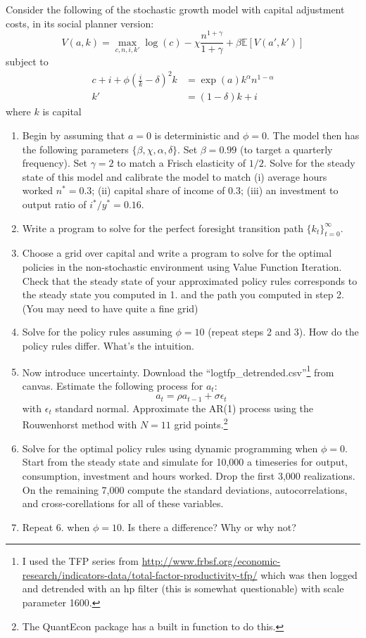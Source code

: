 \documentclass{exam}
\begin{document}
Consider the following of the stochastic growth model with capital adjustment costs, in its social planner version:
\[
	V(a,k) = \max_{c,n,i,k'} \log(c)- \chi \frac{n^{1+\gamma}}{1+\gamma}+\beta\mathbb E[V(a',k')]
\]subject to
\begin{align*}
	c + i + \phi(\frac{i}{k} -\delta)^2k &= \exp(a) k^\alpha n^{1-\alpha}\\
	k' &= (1-\delta)k + i
\end{align*}
where $k$ is capital 
\begin{enumerate}
 	\item Begin by assuming that $a=0$ is deterministic and $\phi=0$.  The model then has the following parameters $\{\beta,\chi,\alpha,\delta\}$.  Set $\beta = 0.99$ (to target a quarterly frequency).  Set $\gamma=2$ to match a Frisch elasticity of $1/2$. Solve for the steady state of this model and calibrate the model to match (i) average hours worked $n^* = 0.3$; (ii) capital share of income of 0.3; (iii) an investment to output ratio of $i^*/y^*=0.16$.
 	\item Write a program to solve for the perfect foresight transition path $\{k_t\}_{t=0}^\infty$.
 	\item Choose a grid over capital and write a program to solve for the optimal policies in the non-stochastic environment using Value Function Iteration.  Check that the steady state of your approximated policy rules corresponds to  the steady state you computed in 1. and the path you computed in step 2. (You may need to have quite a fine grid)
 	\item  Solve for the policy rules assuming $\phi=10$ (repeat steps 2 and 3).  How do the policy rules differ.  What's the intuition.    
 	\item  Now introduce uncertainty.  Download the ``logtfp\_detrended.csv''\footnote{I used the TFP series from \url{http://www.frbsf.org/economic-research/indicators-data/total-factor-productivity-tfp/} which was then logged and detrended with an hp filter (this is somewhat questionable) with scale parameter 1600.} from canvas.  Estimate the following process for $a_t$:
 	\[
 		a_t = \rho a_{t-1} +\sigma \epsilon_t
 	\]with $\epsilon_t$ standard normal.  Approximate the AR(1) process using the Rouwenhorst method with $N=11$ grid points.\footnote{The QuantEcon package has a built in function to do this.}
 	\item  Solve for the optimal policy rules using dynamic programming when $\phi=0$.  Start from the steady state and simulate for 10,000 a timeseries for output, consumption, investment and hours worked.  Drop the first 3,000 realizations.  On the remaining 7,000 compute the standard deviations, autocorrelations, and cross-corellations for all of these variables.
 	\item  Repeat 6. when $\phi=10$.  Is there a difference?  Why or why not?
 \end{enumerate} 
\end{document}
